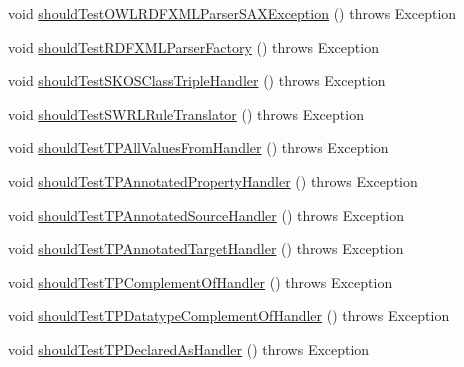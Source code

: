 \begin{DoxyCompactItemize}
void \hyperlink{classorg_1_1semanticweb_1_1owlapi_1_1contract_1_1_contract_rdfxml_parser_test_a0a7b0927fea17bb7555e7474a18ff5e4}{should\-Test\-O\-W\-L\-R\-D\-F\-X\-M\-L\-Parser\-S\-A\-X\-Exception} ()  throws Exception 
\item 
void \hyperlink{classorg_1_1semanticweb_1_1owlapi_1_1contract_1_1_contract_rdfxml_parser_test_a4840eddb29cfb9bb6afa316555865521}{should\-Test\-R\-D\-F\-X\-M\-L\-Parser\-Factory} ()  throws Exception 
\item 
void \hyperlink{classorg_1_1semanticweb_1_1owlapi_1_1contract_1_1_contract_rdfxml_parser_test_a1d856c306a22de77865b499fa4d1fc2c}{should\-Test\-S\-K\-O\-S\-Class\-Triple\-Handler} ()  throws Exception 
\item 
void \hyperlink{classorg_1_1semanticweb_1_1owlapi_1_1contract_1_1_contract_rdfxml_parser_test_a92c9c1d6e40e86148864f95add0f7ee0}{should\-Test\-S\-W\-R\-L\-Rule\-Translator} ()  throws Exception 
\item 
void \hyperlink{classorg_1_1semanticweb_1_1owlapi_1_1contract_1_1_contract_rdfxml_parser_test_a7f523a8b7ddd0e386f96cc3c74d34861}{should\-Test\-T\-P\-All\-Values\-From\-Handler} ()  throws Exception 
\item 
void \hyperlink{classorg_1_1semanticweb_1_1owlapi_1_1contract_1_1_contract_rdfxml_parser_test_aa180a48b22fb608458362c5d16e47030}{should\-Test\-T\-P\-Annotated\-Property\-Handler} ()  throws Exception 
\item 
void \hyperlink{classorg_1_1semanticweb_1_1owlapi_1_1contract_1_1_contract_rdfxml_parser_test_a2ffc585a03aff60e477de99922fffad5}{should\-Test\-T\-P\-Annotated\-Source\-Handler} ()  throws Exception 
\item 
void \hyperlink{classorg_1_1semanticweb_1_1owlapi_1_1contract_1_1_contract_rdfxml_parser_test_a0afe220b24ff23283535477d0d60a81b}{should\-Test\-T\-P\-Annotated\-Target\-Handler} ()  throws Exception 
\item 
void \hyperlink{classorg_1_1semanticweb_1_1owlapi_1_1contract_1_1_contract_rdfxml_parser_test_ad697237845cce53f7efedea5dbc6fcf7}{should\-Test\-T\-P\-Complement\-Of\-Handler} ()  throws Exception 
\item 
void \hyperlink{classorg_1_1semanticweb_1_1owlapi_1_1contract_1_1_contract_rdfxml_parser_test_aaa2cea0e15412fa219c29d1028f97d0d}{should\-Test\-T\-P\-Datatype\-Complement\-Of\-Handler} ()  throws Exception 
\item 
void \hyperlink{classorg_1_1semanticweb_1_1owlapi_1_1contract_1_1_contract_rdfxml_parser_test_a09dc8b3a60d28f27737a762cda5bfae8}{should\-Test\-T\-P\-Declared\-As\-Handler} ()  throws Exception 

\end{DoxyCompactItemize}
